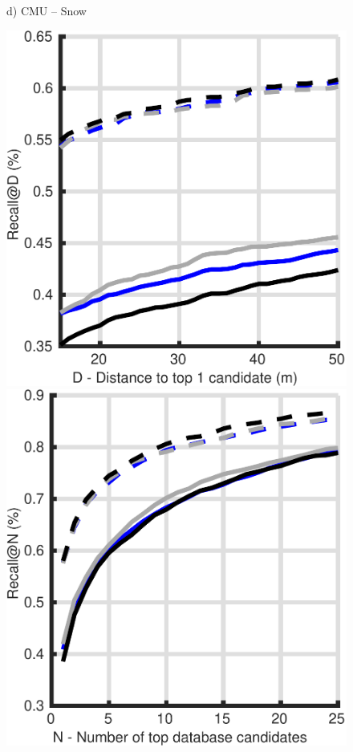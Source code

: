 \begin{figure}
\begin{minipage}{0.19\linewidth}
		d) CMU -- Snow
	\end{minipage}
	\begin{minipage}{0.19\linewidth}
		\center \scriptsize
		\includegraphics[width=\linewidth]{plot/depth_vs_ref/Results_cmu_autumn/distance}	
		
		\includegraphics[width=\linewidth]{plot/depth_vs_ref/Results_cmu_autumn/recall}
		

\end{minipage}
\end{figure}
